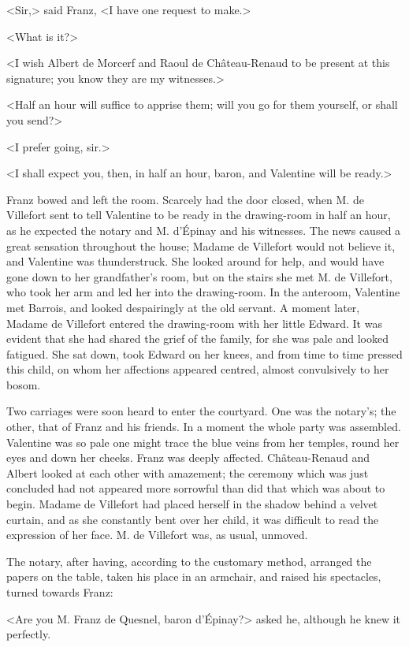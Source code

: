  <Sir,> said Franz, <I have one request to make.> 

 <What is it?> 

 <I wish Albert de Morcerf and Raoul de Château-Renaud to be present at this signature; you know they are my witnesses.> 

 <Half an hour will suffice to apprise them; will you go for them yourself, or shall you send?> 

 <I prefer going, sir.> 

 <I shall expect you, then, in half an hour, baron, and Valentine will be ready.> 

 Franz bowed and left the room. Scarcely had the door closed, when M. de Villefort sent to tell Valentine to be ready in the drawing-room in half an hour, as he expected the notary and M. d'Épinay and his witnesses. The news caused a great sensation throughout the house; Madame de Villefort would not believe it, and Valentine was thunderstruck. She looked around for help, and would have gone down to her grandfather's room, but on the stairs she met M. de Villefort, who took her arm and led her into the drawing-room. In the anteroom, Valentine met Barrois, and looked despairingly at the old servant. A moment later, Madame de Villefort entered the drawing-room with her little Edward. It was evident that she had shared the grief of the family, for she was pale and looked fatigued. She sat down, took Edward on her knees, and from time to time pressed this child, on whom her affections appeared centred, almost convulsively to her bosom. 

 Two carriages were soon heard to enter the courtyard. One was the notary's; the other, that of Franz and his friends. In a moment the whole party was assembled. Valentine was so pale one might trace the blue veins from her temples, round her eyes and down her cheeks. Franz was deeply affected. Château-Renaud and Albert looked at each other with amazement; the ceremony which was just concluded had not appeared more sorrowful than did that which was about to begin. Madame de Villefort had placed herself in the shadow behind a velvet curtain, and as she constantly bent over her child, it was difficult to read the expression of her face. M. de Villefort was, as usual, unmoved. 

 The notary, after having, according to the customary method, arranged the papers on the table, taken his place in an armchair, and raised his spectacles, turned towards Franz: 

 <Are you M. Franz de Quesnel, baron d'Épinay?> asked he, although he knew it perfectly. 

